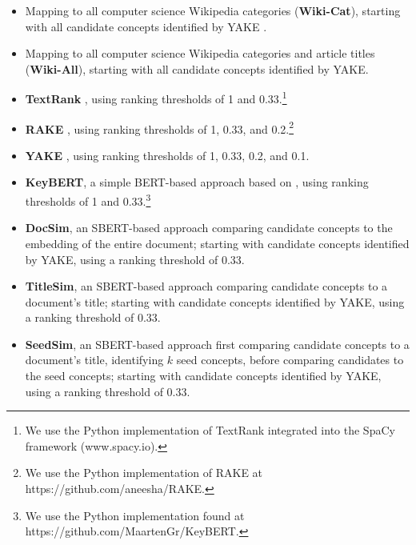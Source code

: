 \documentclass[thesis.tex]{subfiles}
\begin{document}
\begin{itemize}
\setlength\itemsep{-1em}
\item Mapping to all computer science Wikipedia categories (\textbf{Wiki-Cat}), starting with all candidate concepts identified by YAKE \citep{campos2020yake}.
\item Mapping to all computer science Wikipedia categories and article titles (\textbf{Wiki-All}), starting with all candidate concepts identified by YAKE.
\item \textbf{TextRank} \citep{mihalcea2004textrank}, using ranking thresholds of 1 and 0.33.\footnote{We use the Python implementation of TextRank \citep{paco2016pytextrank} integrated into the SpaCy framework (www.spacy.io).}
\item \textbf{RAKE} \citep{rose2010automatic}, using ranking thresholds of 1, 0.33, and 0.2.\footnote{We use the Python implementation of RAKE at https://github.com/aneesha/RAKE.}
\item \textbf{YAKE} \citep{campos2020yake}, using ranking thresholds of 1, 0.33, 0.2, and 0.1.
\item \textbf{KeyBERT}, a simple BERT-based approach based on \cite{sharma2019self}, using ranking thresholds of 1 and 0.33.\footnote{We use the Python implementation found at https://github.com/MaartenGr/KeyBERT.}
\item \textbf{DocSim}, an SBERT-based approach comparing candidate concepts to the embedding of the entire document; starting with candidate concepts identified by YAKE, using a ranking threshold of 0.33.
\item \textbf{TitleSim}, an SBERT-based approach comparing candidate concepts to a document's title; starting with candidate concepts identified by YAKE, using a ranking threshold of 0.33.
\item \textbf{SeedSim}, an SBERT-based approach first comparing candidate concepts to a document's title, identifying $k$ seed concepts, before comparing candidates to the seed concepts; starting with candidate concepts identified by YAKE, using a ranking threshold of 0.33.
\end{itemize}
\end{document}
